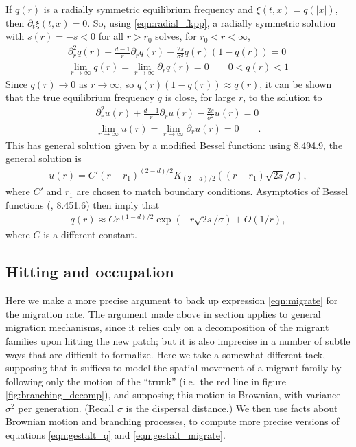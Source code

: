 \documentclass{article}
\newcommand{\linelabel}[1]{}
\newcommand{\citet}[1]{\cite{#1}}
\newcommand{\secref}[1]{{\emph{\nameref{#1}}}}
\begin{document}
If $q(r)$ is a radially symmetric equilibrium frequency and $\xi(t,x)=q(|x|)$,
then $\partial_t \xi(t,x) = 0$.
So, using \eqref{eqn:radial_fkpp}, a radially symmetric solution 
with $s(r) = -s < 0$ for all $r>r_0$ 
solves, for $r_0 < r < \infty$,
\begin{align} \label{eqn:radial_eqfreq_diffeq}
    \partial_r^2 q(r) + \frac{d-1}{r} \partial_r q(r) - \frac{2s}{\sigma^2} q(r) (1-q(r)) = 0 \\
    \lim_{r \to \infty} q(r) = \lim_{r \to \infty} \partial_r q(r) = 0 \qquad 
    0 < q(r) < 1 
\end{align}
Since $q(r) \to 0$ as $r \to \infty$, so $q(r) (1-q(r)) \approx q(r)$,
it can be shown 
that the true equilibrium frequency $q$ is close, for large $r$, to the solution to
\begin{align}
    \partial_r^2 u(r) + \frac{d-1}{r} \partial_r u(r) - \frac{2s}{\sigma^2} u(r) = 0  \label{eqn:bessel} \\
    \lim_{r \to \infty} u(r) = \lim_{r \to \infty} \partial_r u(r) = 0 \qquad  .
\end{align}
This has general solution given by a modified Bessel function:
using \citet{gradshteyn2007table} 8.494.9,
the general solution is
\begin{align}
    u(r) = C' (r-r_1)^{(2-d)/2} K_{(2-d)/2} \left( (r-r_1) \sqrt{2s}/\sigma \right) ,
\end{align}
where $C'$ and $r_1$ are chosen to match boundary conditions.
Asymptotics of Bessel functions (\citet{gradshteyn2007table}, 8.451.6) then imply that
\begin{align}
    q(r) \approx C r^{(1-d)/2} \exp \left( -r \sqrt{2s}/\sigma \right) + O(1/r),
\end{align}
where $C$ is a different constant.



\subsection[Hitting and Occupation]{Hitting and occupation}
\label{ss:hitting_occupation}

Here we make a more precise argument to back up expression \eqref{eqn:migrate} for the migration rate.
The argument made above in section \secref{ss:heuristics} applies to general migration mechanisms,
since it relies only on a decomposition of the migrant families upon hitting the new patch;
but it is also imprecise in a number of subtle ways
that are difficult to formalize.
Here we take a somewhat different tack,
supposing that it suffices to model the spatial movement of a migrant family
by following only the motion of the ``trunk''
(i.e.\ the red line in figure \ref{fig:branching_decomp}),
and supposing this motion is Brownian, with variance $\sigma^2$ per generation.
(Recall $\sigma$ is the dispersal distance.)
We then use facts about Brownian motion and branching processes, 
to compute more precise versions of equations \eqref{eqn:gestalt_q} and \eqref{eqn:gestalt_migrate}.
\linelabel{rr:moved_argument}
\end{document}
